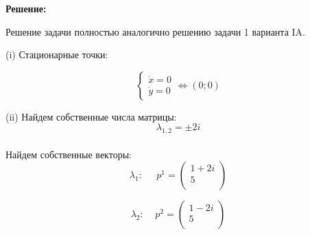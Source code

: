 \documentclass[a4paper, 12pt]{article}
\begin{document}
\textbf{Решение:} \par
Решение задачи полностью аналогично решению задачи 1 варианта IA.  

(i) Стационарные точки:

\[
\left\{
\begin{array}{lr}
\dot{x} = 0\\
\dot{y} = 0
\end{array}
\right.
\Leftrightarrow (0;0)
\]


(ii) Найдем собственные числа матрицы:
\[\lambda_{1,2}=\pm2i\]
\\Найдем собственные векторы:
\[\lambda_1:\;\;\;\;\; p^1=
\left(
\begin{array}{cc}
1+2i\\
5\\
\end{array}
\right)  
\]



\[\lambda_2:\;\;\;\; p^2=
\left(
\begin{array}{cc}
1-2i\\
5\\
\end{array}
\right) 
\]
\end{document}
